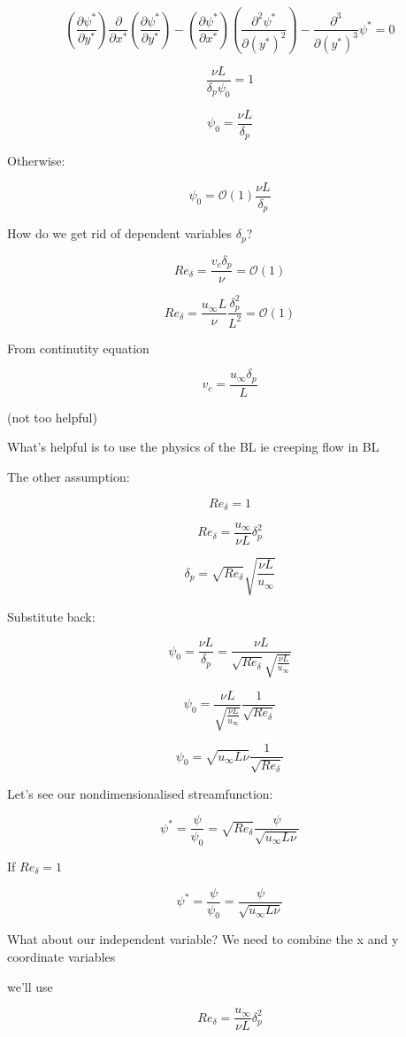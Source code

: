 \documentclass[11pt]{article}
\begin{document}
$$  (\frac{\partial \psi^*}{\partial y^*})  \frac{\partial}{\partial x^* } (\frac{\partial \psi^*}{\partial y^*}) - (\frac{\partial \psi^*}{\partial x^*})  (\frac{\partial^2 \psi^*}{\partial (y^*)^2}) - \frac{\partial^3}{\partial (y^*)^3} \psi^*  =  0$$

$$\frac{\nu L }{\delta_p \psi_0} = 1$$

$$\psi_0 = \frac{\nu L}{\delta_p}$$

Otherwise:

$$\psi_0 = \mathcal{O}(1) \frac{\nu L}{\delta_p} $$

How do we get rid of dependent variables $\delta_p$?

$$Re_\delta = \frac{v_c \delta_p}{\nu}=\mathcal{O}(1)$$

$$Re_\delta = \frac{u_\infty L}{\nu} \frac{\delta_p^2}{L^2} = \mathcal{O}(1)$$

From continutity equation 

$$v_c = \frac{u_\infty \delta_p}{L}$$

(not too helpful)

What's helpful is to use the physics of the BL ie creeping flow in BL

The other assumption: 

$$Re_\delta = 1$$

$$Re_\delta = \frac{u_\infty }{\nu L}\delta_p^2$$

$$\delta_p  = \sqrt{Re_\delta} \sqrt{\frac{\nu L}{u_\infty}}$$

Substitute back:

$$\psi_0 = \frac{\nu L}{\delta_p}=\frac{\nu L}{\sqrt{Re_\delta} \sqrt{\frac{\nu L}{u_\infty}}} $$

$$\psi_0 =\frac{\nu L}{ \sqrt{\frac{\nu L}{u_\infty}}} \frac{1}{\sqrt{Re_\delta}} $$


$$\psi_0 = \sqrt{u_\infty L \nu} \frac{1}{\sqrt{Re_\delta}} $$

Let's see our nondimensionalised streamfunction:

$$\psi^* = \frac{\psi}{\psi_0} = \sqrt{Re_\delta} \frac{\psi}{\sqrt{u_\infty L \nu }} $$

If $Re_\delta=1$

$$\psi^* = \frac{\psi}{\psi_0} = \frac{\psi}{\sqrt{u_\infty L \nu }} $$

What about our independent variable? We need to combine the x and y coordinate variables

we'll use 


$$Re_\delta = \frac{u_\infty }{\nu L}\delta_p^2$$
\end{document}
